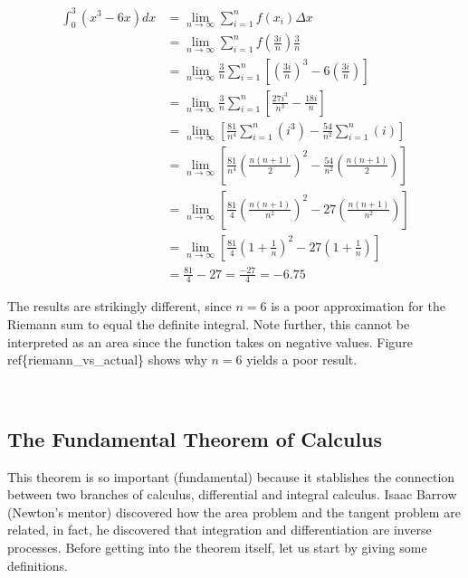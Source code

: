 \documentclass[11pt]{article}
\begin{document}
\begin{align*}
\int^3_0 (x^3-6x) dx &= \lim_{n\rightarrow\infty} \sum^n_{i=1} f(x_i) \Delta x \\
&= \lim_{n\rightarrow\infty} \sum^n_{i=1} f\left(\frac{3i}{n}\right) \frac{3}{n} \\
&= \lim_{n\rightarrow\infty} \frac{3}{n} \sum^n_{i=1} \left[\left(\frac{3i}{n}\right)^3 - 6\left(\frac{3i}{n}\right)\right] \\
&= \lim_{n\rightarrow\infty} \frac{3}{n} \sum^n_{i=1} \left[ \frac{27i^3}{n^3} - \frac{18 i}{n} \right] \\
&= \lim_{n\rightarrow\infty} \left[\frac{81}{n^4} \sum^n_{i=1} \left(i^3\right) - \frac{54}{n^2} \sum^n_{i=1} \left(i\right)\right] \\
&= \lim_{n\rightarrow\infty} \left[\frac{81}{n^4} \left(\frac{n(n+1)}{2}\right)^2 - \frac{54}{n^2} \left(\frac{n(n+1)}{2}\right)\right] \\
&= \lim_{n\rightarrow\infty} \left[\frac{81}{4} \left(\frac{n(n+1)}{n^2}\right)^2 - 27\left(\frac{n(n+1)}{n^2}\right)\right] \\
&= \lim_{n\rightarrow\infty} \left[\frac{81}{4} \left(1+\frac{1}{n}\right)^2 - 27\left(1+\frac{1}{n}\right)\right] \\
&= \frac{81}{4} - 27 = \frac{-27}{4} = -6.75
\end{align*}

The results are strikingly different, since \(n = 6\) is a poor
approximation for the Riemann sum to equal the definite integral. Note
further, this cannot be interpreted as an area since the function takes
on negative values. Figure ref\{riemann\_vs\_actual\} shows why \(n=6\)
yields a poor result.

    \begin{center}
    \end{center}
    { \hspace*{\fill} \\}
    
    \hypertarget{the-fundamental-theorem-of-calculus}{%
\subsection{The Fundamental Theorem of
Calculus}\label{the-fundamental-theorem-of-calculus}}

This theorem is so important (fundamental) because it stablishes the
connection between two branches of calculus, differential and integral
calculus. Isaac Barrow (Newton's mentor) discovered how the area problem
and the tangent problem are related, in fact, he discovered that
integration and differentiation are inverse processes. Before getting
into the theorem itself, let us start by giving some definitions.
\end{document}
